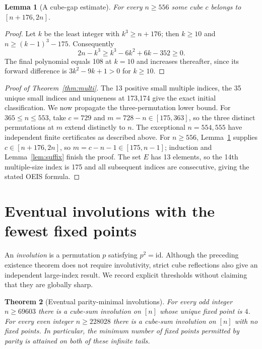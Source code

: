 \documentclass[9pt]{extarticle}
\newtheorem{theorem}{Theorem}[section]
\newtheorem{lemma}[theorem]{Lemma}
\begin{document}
\begin{lemma}[A cube-gap estimate]\label{lem:gap}
For every $n\ge556$ some cube $c$ belongs to $[n+176,2n]$.
\end{lemma}
\begin{proof}
Let $k$ be the least integer with $k^3\ge n+176$; then $k\ge10$ and $n\ge(k-1)^3-175$. Consequently
\[
2n-k^3\ge k^3-6k^2+6k-352\ge0.
\]
The final polynomial equals 108 at $k=10$ and increases thereafter, since its forward difference is $3k^2-9k+1>0$ for $k\ge10$.
\end{proof}
\begin{proof}[Proof of Theorem~\ref{thm:multi}]
The 13 positive small multiple indices, the 35 unique small indices and uniqueness at 173,174 give the exact initial classification. We now propagate the three-permutation lower bound. For $365\le n\le553$, take $c=729$ and $m=728-n\in[175,363]$, so the three distinct permutations at $m$ extend distinctly to $n$. The exceptional $n=554,555$ have independent finite certificates as described above. For $n\ge556$, Lemma~\ref{lem:gap} supplies $c\in[n+176,2n]$, so $m=c-n-1\in[175,n-1]$; induction and Lemma~\ref{lem:suffix} finish the proof. The set $E$ has 13 elements, so the 14th multiple-size index is 175 and all subsequent indices are consecutive, giving the stated OEIS formula.
\end{proof}


\section{Eventual involutions with the fewest fixed points}\label{sec:invol}
An \emph{involution} is a permutation $p$ satisfying $p^2=\mathrm{id}$.
Although the preceding existence theorem does not require involutivity,
strict cube reflections also give an independent large-index result.  We
record explicit thresholds without claiming that they are globally sharp.

\begin{theorem}[Eventual parity-minimal involutions]\label{thm:involtail}
For every odd integer $n\ge69603$ there is a cube-sum involution on
$[n]$ whose unique fixed point is $4$.  For every even integer
$n\ge228028$ there is a cube-sum involution on $[n]$ with no fixed
points.  In particular, the minimum number of fixed points permitted by
parity is attained on both of these infinite tails.
\end{theorem}
\end{document}
